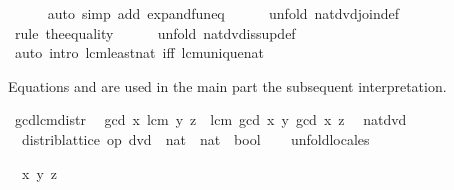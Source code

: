 \begin{isabellebody}
\ \ \ \ \isamarkupfalse%
\ {\isacharparenleft}auto\ simp\ add{\isacharcolon}\ expand{\isacharunderscore}fun{\isacharunderscore}eq{\isacharparenright}\isanewline
\ \ \ \ \isamarkupfalse%
\ {\isacharparenleft}unfold\ nat{\isacharunderscore}dvd{\isachardot}join{\isacharunderscore}def{\isacharparenright}\isanewline
\ \ \ \ \isamarkupfalse%
\ {\isacharparenleft}rule\ the{\isacharunderscore}equality{\isacharparenright}\isanewline
\ \ \ \ \isamarkupfalse%
\ {\isacharparenleft}unfold\ nat{\isacharunderscore}dvd{\isachardot}is{\isacharunderscore}sup{\isacharunderscore}def{\isacharparenright}\isanewline
\ \ \ \ \isamarkupfalse%
\ {\isacharparenleft}auto\ intro{\isacharcolon}\ lcm{\isacharunderscore}least{\isacharunderscore}nat\ iff{\isacharcolon}\ lcm{\isacharunderscore}unique{\isacharunderscore}nat{\isacharparenright}\isanewline
\ \ \ \ \isamarkupfalse%
\isanewline
{}\isamarkupfalse%
%
\endisatagproof
{\isafoldproof}%
%
\isadelimproof
%
\endisadelimproof
%
\begin{isamarkuptext}%
Equations  and  are used in the main part the subsequent
  interpretation.%
\end{isamarkuptext}%
\isamarkuptrue%
%
\isadeliminvisible
%
\endisadeliminvisible
%
\isataginvisible
{}\isamarkupfalse%
\ gcd{\isacharunderscore}lcm{\isacharunderscore}distr{\isacharcolon}\isanewline
\ \ {\isachardoublequoteopen}gcd\ x\ {\isacharparenleft}lcm\ y\ z{\isacharparenright}\ {\isacharequal}\ lcm\ {\isacharparenleft}gcd\ x\ y{\isacharparenright}\ {\isacharparenleft}gcd\ x\ z{\isacharparenright}{\isachardoublequoteclose}\ \isamarkupfalse%
%
\endisataginvisible
{\isafoldinvisible}%
%
\isadeliminvisible
%
\endisadeliminvisible
\isanewline
%
\isadelimvisible
\isanewline
%
\endisadelimvisible
%
\isatagvisible
{}\isamarkupfalse%
\ nat{\isacharunderscore}dvd{\isacharcolon}\isanewline
\ \ distrib{\isacharunderscore}lattice\ {\isachardoublequoteopen}op\ dvd\ {\isacharcolon}{\isacharcolon}\ nat\ {\isasymRightarrow}\ nat\ {\isasymRightarrow}\ bool{\isachardoublequoteclose}\isanewline
\ \ \isamarkupfalse%
\ unfold{\isacharunderscore}locales%
\begin{isamarkuptxt}%
\begin{isabelle}%
\ {}{\isachardot}\ {\isasymAnd}x\ y\ z{\isachardot}\isanewline

\end{isabelle}
\end{isamarkuptxt}
\end{isabellebody}
